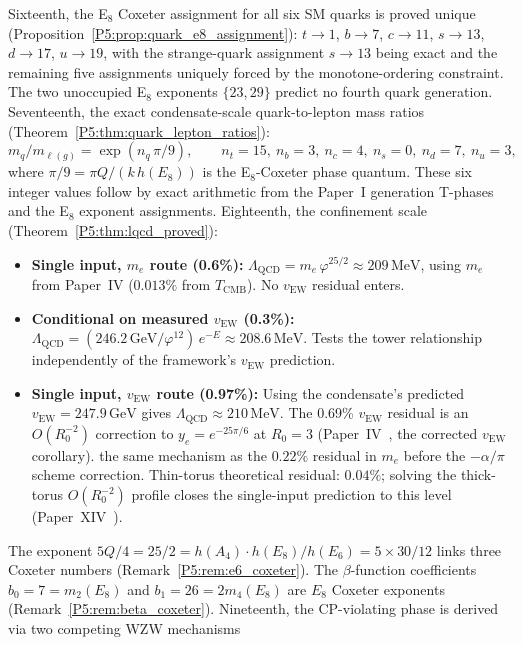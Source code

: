\documentclass[11pt,a4paper]{article}
\theoremstyle{definition}
\theoremstyle{remark}
\newcommand{\vp}{\varphi}
\newcommand{\TCMB}{T_{\mathrm{CMB}}}
\newcommand{\vEW}{v_{\mathrm{EW}}}
\newcommand{\LQCD}{\Lambda_{\mathrm{QCD}}}
\begin{document}
Sixteenth, the E$_8$ Coxeter assignment for all six SM quarks is proved
unique (Proposition~\ref{P5:prop:quark_e8_assignment}):
$t\to1$, $b\to7$, $c\to11$, $s\to13$, $d\to17$, $u\to19$,
with the strange-quark assignment $s\to13$ being exact and the remaining
five assignments uniquely forced by the monotone-ordering constraint.
The two unoccupied E$_8$ exponents $\{23,29\}$ predict no fourth quark generation.
Seventeenth, the exact condensate-scale quark-to-lepton mass ratios
(Theorem~\ref{P5:thm:quark_lepton_ratios}):
\begin{equation*}
  m_q/m_{\ell(g)} = \exp(n_q\,\pi/9), \qquad
  n_t=15,\ n_b=3,\ n_c=4,\ n_s=0,\ n_d=7,\ n_u=3,
\end{equation*}
where $\pi/9 = \pi Q/(k\,h(E_8))$ is the E$_8$-Coxeter phase quantum.
These six integer values follow by exact arithmetic from
the Paper~I generation T-phases and the E$_8$ exponent assignments.
Eighteenth, the confinement scale (Theorem~\ref{P5:thm:lqcd_proved}):
\begin{itemize}[noitemsep]
\item \textbf{Single input, $m_e$ route (0.6\%):}
  $\LQCD = m_e\,\vp^{25/2}\approx209\,\mathrm{MeV}$,
  using $m_e$ from Paper~IV ($0.013\%$ from $\TCMB$).
  No $\vEW$ residual enters.
\item \textbf{Conditional on measured $\vEW$ (0.3\%):}
  $\LQCD = (246.2\,\mathrm{GeV}/\vp^{12})\,e^{-E}\approx208.6\,\mathrm{MeV}$.
  Tests the tower relationship independently of the framework's $\vEW$ prediction.
\item \textbf{Single input, $\vEW$ route (0.97\%):}
  Using the condensate's predicted $\vEW=247.9\,\mathrm{GeV}$
  gives $\LQCD\approx210\,\mathrm{MeV}$.
  The 0.69\% $\vEW$ residual is an $O(R_0^{-2})$ correction to
  $y_e=e^{-25\pi/6}$ at $R_0=3$ (Paper~IV~\cite{Paper4}, the corrected
  $\vEW$ corollary). %
  the same mechanism as the $0.22\%$ residual in $m_e$ before
  the $-\alpha/\pi$ scheme correction.
  Thin-torus theoretical residual: $0.04\%$;
  solving the thick-torus $O(R_0^{-2})$ profile closes the
  single-input prediction to this level (Paper~XIV~\cite{Paper14}). %
\end{itemize}
The exponent $5Q/4=25/2=h(A_4)\cdot h(E_8)/h(E_6)=5\times30/12$ links three
Coxeter numbers (Remark~\ref{P5:rem:e6_coxeter}).
The $\beta$-function coefficients $b_0=7=m_2(E_8)$ and $b_1=26=2m_4(E_8)$
are $E_8$ Coxeter exponents (Remark~\ref{P5:rem:beta_coxeter}).
Nineteenth, the CP-violating phase is derived via two competing WZW mechanisms
\end{document}
